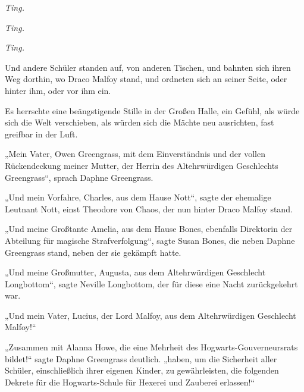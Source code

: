 \emph{Ting.}

\emph{Ting.}

\emph{Ting.}

Und andere Schüler standen auf, von anderen Tischen, und bahnten sich ihren Weg dorthin, wo Draco Malfoy stand, und ordneten sich an seiner Seite, oder hinter ihm, oder vor ihm ein.

Es herrschte eine beängstigende Stille in der Großen Halle, ein Gefühl, als würde sich die Welt verschieben, als würden sich die Mächte neu ausrichten, fast greifbar in der Luft.

„Mein Vater, Owen Greengrass, mit dem Einverständnis und der vollen Rückendeckung meiner Mutter, der Herrin des Altehrwürdigen Geschlechts Greengrass“, sprach Daphne Greengrass.

„Und mein Vorfahre, Charles, aus dem Hause Nott“, sagte der ehemalige Leutnant Nott, einst Theodore von Chaos, der nun hinter Draco Malfoy stand.

„Und meine Großtante Amelia, aus dem Hause Bones, ebenfalls Direktorin der Abteilung für magische Strafverfolgung“, sagte Susan Bones, die neben Daphne Greengrass stand, neben der sie gekämpft hatte.

„Und meine Großmutter, Augusta, aus dem Altehrwürdigen Geschlecht Longbottom“, sagte Neville Longbottom, der für diese eine Nacht zurückgekehrt war.

„Und mein Vater, Lucius, der Lord Malfoy, aus dem Altehrwürdigen Geschlecht Malfoy!“

„Zusammen mit Alanna Howe, die eine Mehrheit des Hogwarts-Gouverneursrats bildet!“ sagte Daphne Greengrass deutlich. „haben, um die Sicherheit aller Schüler, einschließlich ihrer eigenen Kinder, zu gewährleisten, die folgenden Dekrete für die Hogwarts-Schule für Hexerei und Zauberei erlassen!“

